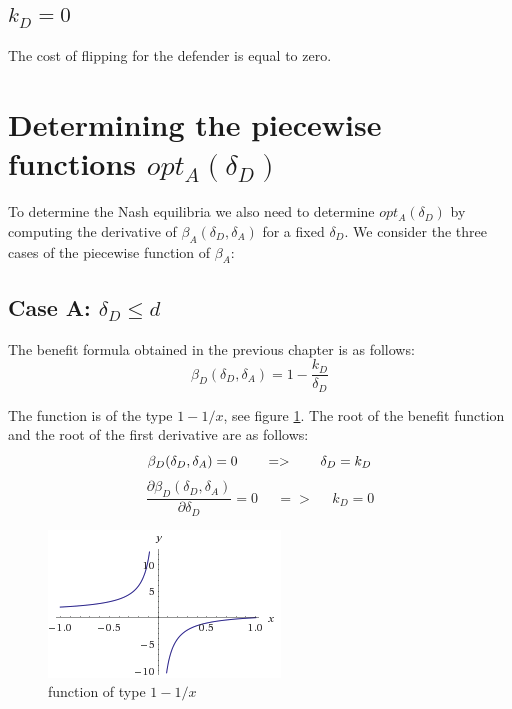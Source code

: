 \subsection*{$k_{D}=0$}
The cost of flipping for the defender is equal to zero. 


%
%
\section{Determining the piecewise functions $opt_{A}(\delta_{D})$}
To determine the Nash equilibria we also need to determine $opt_{A}(\delta_{D})$ by computing the derivative of $\beta_{A}(\delta_{D},\delta_{A})$ for a fixed $\delta_{D}$. We consider the three cases of the piecewise function of $\beta_{A}$: \\


\subsection*{Case A: $\delta_{D} \leq d$}

The benefit formula obtained in the previous chapter is as follows:
\begin{equation}
\beta_{D}(\delta_{D},\delta_{A}) = 1 - \dfrac{k_{D}}{\delta_{D}}
\end{equation}


The function is of the type $1-1/x$, see figure \ref{1x}. The root of the benefit function  and the root of the first derivative are as follows:
\begin{equation}
\beta_{D}(\delta_{D},\delta_{A}) =0  ~~~~~~ =>~~~~~~\delta_{D} = k_{D} \\
\end{equation}
\begin{equation}
\dfrac{\partial \beta_{D}(\delta_{D},\delta_{A})}{\partial \delta_{D}} =0 ~~~~~~ =>~~~~~~ k_{D} = 0
\end{equation}

\begin{figure}[hbtp]
\centering
\includegraphics[scale=1]{Images/1x.png}
\caption{function of type $1-1/x$}
\label{1x}
\end{figure}

